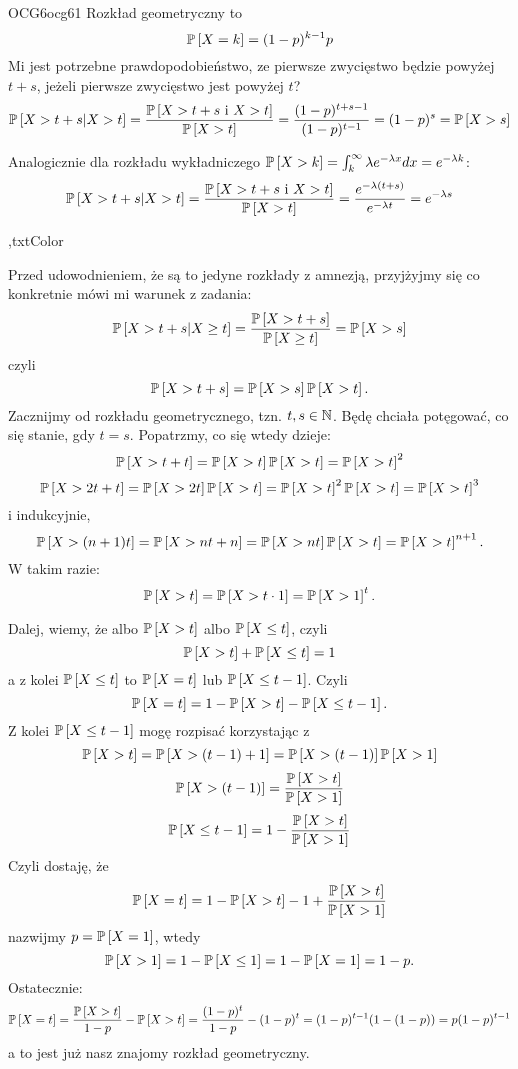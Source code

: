 \documentclass{article}
\begin{document}
\begin{ocg}{OCG6}{ocg6}{1}
Rozkład geometryczny to
$$\prob{X=k}=(1-p)^{k-1}p$$
Mi jest potrzebne prawdopodobieństwo, ze pierwsze zwycięstwo będzie powyżej $t+s$, jeżeli pierwsze zwycięstwo jest powyżej $t$?
\begin{align*}
    \prob{X>t+s|X> t}=\frac{\prob{X>t+s\text{ i }X> t}}{\prob{X>t}}=\frac{(1-p)^{t+s-1}}{(1-p)^{t-1}}=(1-p)^{s}=\prob{X>s}
\end{align*}

Analogicznie dla rozkładu wykładniczego $\prob{X>k}=\int_k^\infty\lambda e^{-\lambda x}dx=e^{-\lambda k}$:
\begin{align*}
    \prob{X>t+s|X> t}=\frac{\prob{X>t+s\text{ i }X> t}}{\prob{X>t}}=\frac{e^{-\lambda(t+s)}}{ e^{-\lambda t}}=e^{-\lambda s}
\end{align*}

\sep{txtColor}

Przed udowodnieniem, że są to jedyne rozkłady z amnezją, przyjżyjmy się co konkretnie mówi mi warunek z zadania:
$$\prob{X>t+s|X\geq t}=\frac{\prob{X>t+s}}{\prob{X\geq t}}=\prob{X>s}$$
czyli
$$\prob{X>t+s}=\prob{X>s}\prob{X> t}.$$
Zacznijmy od rozkładu geometrycznego, tzn. $t,s\in\mathbb{N}$. Będę chciała potęgować, co się stanie, gdy $t=s$. Popatrzmy, co się wtedy dzieje:
$$\prob{X>t+t}=\prob{X>t}\prob{X> t}=\prob{X>t}^2$$
$$\prob{X>2t+t}=\prob{X>2t}\prob{X>t}=\prob{X>t}^2\prob{X>t}=\prob{X>t}^3$$
i indukcyjnie,
$$\prob{X>(n+1)t}=\prob{X>nt+n}=\prob{X>nt}\prob{X>t}=\prob{X>t}^{n+1}.$$
W takim razie:
$$\prob{X>t}=\prob{X>t\cdot1}=\prob{X>1}^t.$$

Dalej, wiemy, że albo $\prob{X>t}$ albo $\prob{X\leq t}$, czyli
$$\prob{X>t}+\prob{X\leq t}=1$$
a z kolei $\prob{X\leq t}$ to $\prob{X=t}$ lub $\prob{X\leq t-1}$. Czyli
$$\prob{X=t}=1-\prob{X>t}-\prob{X\leq t-1}.$$
Z kolei $\prob{X\leq t-1}$ mogę rozpisać korzystając z 
$$\prob{X>t}=\prob{X>(t-1)+1}=\prob{X>(t-1)}\prob{X>1}$$
$$\prob{X>(t-1)}=\frac{\prob{X>t}}{\prob{X>1}}$$
$$\prob{X\leq t-1}=1-\frac{\prob{X>t}}{\prob{X>1}}$$
Czyli dostaję, że
$$\prob{X=t}=1-\prob{X>t}-1+\frac{\prob{X>t}}{\prob{X>1}}$$
nazwijmy $p=\prob{X=1}$, wtedy 
$$\prob{X>1}=1-\prob{X\leq 1}=1-\prob{X=1}=1-p.$$
Ostatecznie:
$$\prob{X=t}=\frac{\prob{X>t}}{1-p}-\prob{X>t}=\frac{(1-p)^t}{1-p}-(1-p)^t=(1-p)^{t-1}(1-(1-p))=p(1-p)^{t-1}$$
a to jest już nasz znajomy rozkład geometryczny.
\medskip


\end{ocg}
\end{document}
